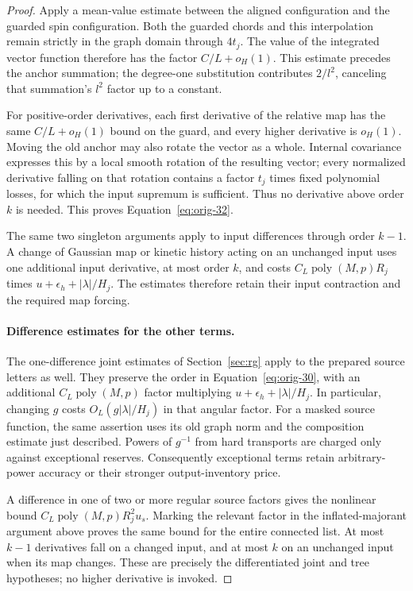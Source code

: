 \begin{proof}
Apply a mean-value estimate between the aligned configuration
and the guarded spin configuration.  Both the guarded chords
and this interpolation remain strictly in the graph domain
through $4t_j$.  The value of the integrated vector function
therefore has the factor $C/L+o_H(1)$.  This estimate precedes the
anchor summation; the degree-one substitution contributes
$2/l^2$, canceling that summation's $l^2$ factor up to a constant.

For positive-order derivatives, each first derivative of the
relative map has the same $C/L+o_H(1)$ bound on the guard, and
every higher derivative is $o_H(1)$.  Moving the old anchor may
also rotate the vector as a whole.  Internal covariance expresses
this by a local smooth rotation of the resulting vector; every
normalized derivative falling on that rotation contains a
factor $t_j$ times fixed polynomial losses, for which the input
supremum is sufficient.  Thus no derivative above order $k$ is
needed.  This proves Equation~\eqref{eq:orig-32}.

The same two singleton arguments apply to input differences
through order $k-1$.  A change of Gaussian map or kinetic history
acting on an unchanged input uses one additional input derivative,
at most order $k$, and costs
$C_L\operatorname{poly}(M,p)R_j$ times
$u+\epsilon_h+|\lambda|/H_j$.  The estimates therefore retain
their input contraction and the required map forcing.

\paragraph{Difference estimates for the other terms.}
The one-difference joint estimates of Section~\ref{sec:rg} apply
to the prepared source letters as well.  They preserve the order
in Equation~\eqref{eq:orig-30}, with an additional
$C_L\operatorname{poly}(M,p)$ factor multiplying
$u+\epsilon_h+|\lambda|/H_j$.  In particular, changing $g$ costs
$O_L(g|\lambda|/H_j)$ in that angular factor.  For a masked
source function, the same assertion uses its old graph norm
and the composition estimate just described.  Powers of $g^{-1}$
from hard transports are charged only against exceptional
reserves.  Consequently exceptional terms retain arbitrary-power
accuracy or their stronger output-inventory price.

A difference in one of two or more regular source factors gives
the nonlinear bound
$C_L\operatorname{poly}(M,p)R_j^2u_s$.  Marking the relevant
factor in the inflated-majorant argument above proves the same
bound for the entire connected list.  At most $k-1$ derivatives
fall on a changed input, and at most $k$ on an unchanged input
when its map changes.  These are precisely the differentiated
joint and tree hypotheses; no higher derivative is invoked.


\end{proof}
